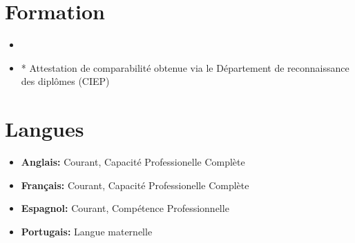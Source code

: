 \documentclass[11pt,a4paper,sans]{moderncv}
\begin{document}
\section{Formation}

\vspace{4pt}

\begin{itemize}

\item{}

\item{}
* Attestation de comparabilité obtenue via le Département de reconnaissance des diplômes (CIEP)
\end{itemize}

\vspace{2pt}

\section{Langues}

\vspace{1pt}

\begin{itemize}

\item \textbf{Anglais:} Courant, Capacité Professionelle Complète 

\vspace{1pt}

\item \textbf{Français:} Courant, Capacité Professionelle Complète 

\vspace{1pt}

\item \textbf{Espagnol:} Courant, Compétence Professionnelle

\vspace{1pt}

\item \textbf{Portugais:} Langue maternelle

\end{itemize}
\end{document}
